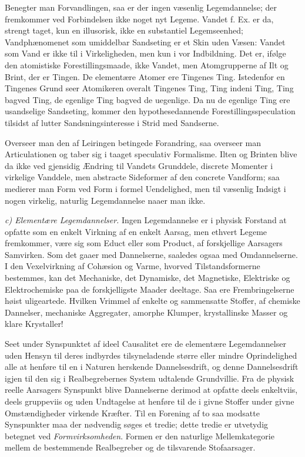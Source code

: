 \documentclass[12pt,a4paper]{book}
\newcommand{\runin}[1]{\emph{#1}\hspace{0.4em}}
\begin{document}
Benegter man Forvandlingen, saa er der ingen væsenlig Legemdannelse; der
fremkommer ved Forbindelsen ikke noget nyt Legeme. Vandet f. Ex. er da,
strengt taget, kun en illusorisk, ikke en substantiel Legemseenhed;
Vandphænomenet som umiddelbar Sandseting er et Skin uden Væsen: Vandet
som Vand er ikke til i Virkeligheden, men kun i vor Indbildning. Det er,
ifølge den atomistiske Forestillingsmaade, ikke Vandet, men
Atomgrupperne af Ilt og Brint, der er Tingen. De elementære Atomer ere
Tingenes Ting. Istedenfor en Tingenes Grund seer Atomikeren overalt
Tingenes Ting, Ting indeni Ting, Ting bagved Ting, de egenlige Ting
bagved de uegenlige. Da nu de egenlige Ting ere usandselige Sandseting,
kommer den hypothesedannende Forestillingsspeculation tilsidst af lutter
Sandsningsinteresse i Strid med Sandserne.

Overseer man den af Leiringen betingede Forandring, saa overseer man
Articulationen og taber sig i taaget speculativ Formalisme. Ilten og
Brinten blive da ikke ved
gjensidig Ændring til Vandets Grunddele, discrete Momenter i virkelige
Vanddele, men abstracte Sideformer af den concrete Vandform; saa medierer
man Form ved Form i formel Uendelighed, men til væsenlig Indsigt i nogen
virkelig, naturlig Legemdannelse naaer man ikke.

\runin{c) Elementære Legemdannelser.} Ingen Legemdannelse er i physisk
Forstand at opfatte som en enkelt Virkning af en enkelt Aarsag, men
ethvert Legeme fremkommer, være sig som Educt eller som Product, af
forskjellige Aarsagers Samvirken. Som det gaaer med Dannelserne,
saaledes ogsaa med Omdannelserne. I den Vexelvirkning af Cohæsion og
Varme, hvorved Tilstandsformerne bestemmes, kan det Mechaniske, det
Dynamiske, det Magnetiske, Elektriske og Elektrochemiske paa de
forskjelligste Maader deeltage. Saa ere Frembringelserne høist
uligeartede. Hvilken Vrimmel af enkelte og sammensatte Stoffer, af
chemiske Dannelser, mechaniske Aggregater, amorphe Klumper,
krystallinske Masser og klare Krystaller!

Seet under Synspunktet af ideel Causalitet ere de elementære
Legemdannelser uden Hensyn til deres indbyrdes tilsyneladende større
eller mindre Oprindelighed alle at henføre til en i Naturen herskende
Dannelsesdrift, og denne Dannelsesdrift igjen til den sig i
Realbegrebernes System udtalende Grundvillie. Fra de physisk reelle
Aarsagers Synspunkt blive Dannelserne derimod at opfatte deels
enkeltviis, deels gruppeviis og uden Undtagelse at henføre til de i
givne Stoffer under givne Omstændigheder virkende Kræfter. Til en
Forening af to saa modsatte Synspunkter maa der nødvendig søges et
tredie; dette tredie er utvetydig betegnet ved \emph{Formvirksomheden}.
Formen er den naturlige Mellemkategorie mellem de bestemmende
Realbegreber og de tilsvarende Stofaarsager.
\end{document}
